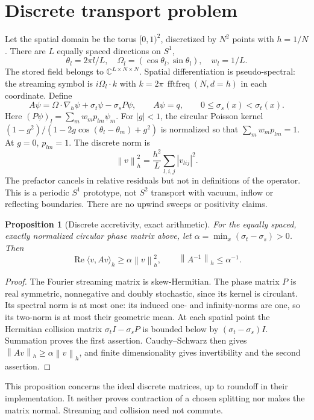 \documentclass[11pt]{article}
\newtheorem{proposition}{Proposition}
\newcommand{\norm}[1]{\left\|#1\right\|}
\newcommand{\C}{\mathbb C}
\begin{document}
\section{Discrete transport problem}
Let the spatial domain be the torus $[0,1)^2$, discretized by $N^2$ points with
$h=1/N$. There are $L$ equally spaced directions on $S^1$,
\[
 \theta_l=2\pi l/L,\quad \Omega_l=(\cos\theta_l,\sin\theta_l),\quad w_l=1/L.
\]
The stored field belongs to $\C^{L\times N\times N}$. Spatial differentiation
is pseudo-spectral: the streaming symbol is $i\Omega_l\cdot k$ with
$k=2\pi\,\operatorname{fftfreq}(N,d=h)$ in each coordinate. Define
\begin{equation}\label{eq:A}
 A\psi=\Omega\cdot\nabla_h\psi+\sigma_t\psi-\sigma_s P\psi,
 \qquad A\psi=q,\qquad 0\leq\sigma_s(x)<\sigma_t(x).
\end{equation}
Here $(P\psi)_l=\sum_m w_m p_{lm}\psi_m$. For $|g|<1$, the circular
Poisson kernel $(1-g^2)/(1-2g\cos(\theta_l-\theta_m)+g^2)$ is normalized so
that $\sum_m w_m p_{lm}=1$. At $g=0$, $p_{lm}=1$.
The discrete norm is
\[
 \norm{v}_h^2=\frac{h^2}{L}\sum_{l,i,j}|v_{lij}|^2.
\]
The prefactor cancels in relative residuals but not in definitions of the
operator. This is a periodic $S^1$ prototype, not $S^2$ transport with vacuum,
inflow or reflecting boundaries. There are no upwind sweeps or positivity claims.

\begin{proposition}[Discrete accretivity, exact arithmetic]\label{prop:acc}
For the equally spaced, exactly normalized circular phase matrix above,
let $\alpha=\min_x(\sigma_t-\sigma_s)>0$. Then
\[
 \operatorname{Re}\langle v,Av\rangle_h\geq\alpha\norm{v}_h^2,
 \qquad \norm{A^{-1}}_h\leq\alpha^{-1}.
\]
\end{proposition}
\begin{proof}
The Fourier streaming matrix is skew-Hermitian. The phase matrix $P$ is real
symmetric, nonnegative and doubly stochastic, since its kernel is circulant.
Its spectral norm is at most one: its induced one- and infinity-norms are one,
so its two-norm is at most their geometric mean. At each spatial point the
Hermitian collision matrix $\sigma_t I-\sigma_s P$ is bounded below by
$(\sigma_t-\sigma_s)I$. Summation proves the first assertion. Cauchy--Schwarz
then gives $\norm{Av}_h\geq\alpha\norm{v}_h$, and finite dimensionality gives
invertibility and the second assertion.
\end{proof}
This proposition concerns the ideal discrete matrices, up to roundoff in their
implementation. It neither proves contraction of a chosen splitting nor makes
the matrix normal. Streaming and collision need not commute.
\end{document}

